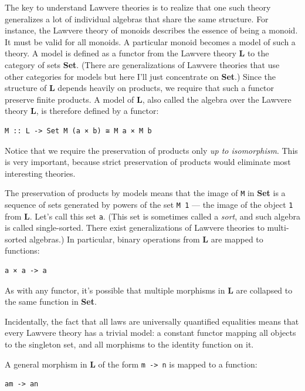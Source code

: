 The key to understand Lawvere theories is to realize that one such
theory generalizes a lot of individual algebras that share the same
structure. For instance, the Lawvere theory of monoids describes the
essence of being a monoid. It must be valid for all monoids. A
particular monoid becomes a model of such a theory. A model is defined
as a functor from the Lawvere theory \textbf{L} to the category of sets
\textbf{Set}. (There are generalizations of Lawvere theories that use
other categories for models but here I'll just concentrate on
\textbf{Set}.) Since the structure of \textbf{L} depends heavily on
products, we require that such a functor preserve finite products. A
model of \textbf{L}, also called the algebra over the Lawvere theory
\textbf{L}, is therefore defined by a functor:

\begin{verbatim}
M :: L -> Set M (a × b) ≅ M a × M b
\end{verbatim}

Notice that we require the preservation of products only \emph{up to
isomorphism}. This is very important, because strict preservation of
products would eliminate most interesting theories.

The preservation of products by models means that the image of
\texttt{M} in \textbf{Set} is a sequence of sets generated by powers of
the set \texttt{M\ 1} --- the image of the object \texttt{1} from
\textbf{L}. Let's call this set \texttt{a}. (This set is sometimes
called a \emph{sort}, and such algebra is called single-sorted. There
exist generalizations of Lawvere theories to multi-sorted algebras.) In
particular, binary operations from \textbf{L} are mapped to functions:

\begin{verbatim}
a × a -> a
\end{verbatim}

As with any functor, it's possible that multiple morphisms in \textbf{L}
are collapsed to the same function in \textbf{Set}.

Incidentally, the fact that all laws are universally quantified
equalities means that every Lawvere theory has a trivial model: a
constant functor mapping all objects to the singleton set, and all
morphisms to the identity function on it.

A general morphism in \textbf{L} of the form
\texttt{m\ -\textgreater{}\ n} is mapped to a function:

\begin{verbatim}
am -> an
\end{verbatim}

